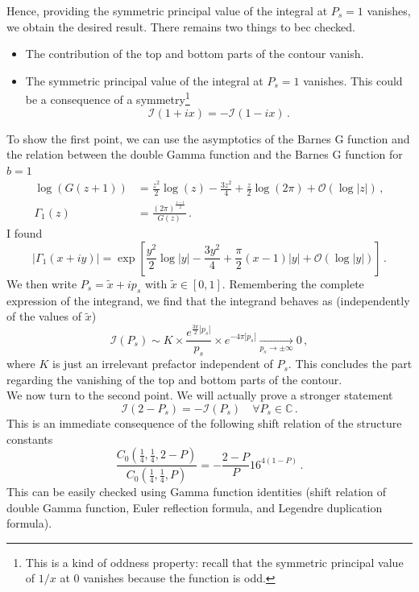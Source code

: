 \documentclass[11pt]{article}
\begin{document}
Hence, providing the symmetric principal value of the integral at $P_s=1$ vanishes, we obtain the desired result. There remains two things to bec checked.
\begin{itemize}
    \item The contribution of the top and bottom parts of the contour vanish.
    \item The symmetric principal value of the integral at $P_s=1$ vanishes. This could be a consequence of a symmetry\footnote{This is a kind of oddness property: recall that the symmetric principal value of $1/x$ at $0$ vanishes because the function is odd.}
    \begin{equation}
    \mathcal{I}(1+i x) = -\mathcal{I}(1-ix)\,.
    \end{equation}
\end{itemize}
To show the first point, we can use the asymptotics of the Barnes G function and the relation between the double Gamma function and the Barnes G function for $b=1$
\begin{equation}
\begin{aligned}
     \log(G(z+1))&=\frac{z^2}{2}\log(z)-\frac{3z^2}{4}+\frac{z}{2}\log(2\pi)+\mathcal{O}(\log|z|)\,,\\
     \Gamma_1(z) &= \frac{(2\pi)^{\frac{z-1}{2}}}{G(z)}\,.
\end{aligned}
\end{equation}
I found 
\begin{equation}
    |\Gamma_1(x+iy)|=\exp\left[\frac{y^2}{2}\log|y| -\frac{3y^2}{4}+\frac{\pi}{2}(x-1)|y|+\mathcal{O}(\log|y|)\right]\,.
\end{equation}
We then write $P_s = \tilde{x}+ip_s$ with $\tilde{x}\in[0,1]$. Remembering the complete expression of the integrand, we find that the integrand behaves as (independently of the values of $\tilde{x}$)
\begin{equation}
    \mathcal{I}(P_s) \sim K \times \frac{e^{\frac{3\pi}{2}|p_s|}}{p_s}\times e^{-4\pi|p_s|} \underset{p_s\to \pm \infty}{\to} 0\,,
\end{equation}
where $K$ is just an irrelevant prefactor independent of $P_s$. This concludes the part regarding the vanishing of the top and bottom parts of the contour.\\

We now turn to the second point. We will actually prove a stronger statement
\begin{equation}
    \mathcal{I}(2-P_s) = -\mathcal{I}(P_s) \quad  \forall P_s \in \mathbb{C}\,.
\end{equation}
This is an immediate consequence of the following shift relation of the structure constants
\begin{equation}
    \frac{C_0\left(\frac{1}{4},\frac{1}{4}, 2-P\right)}{C_0\left(\frac{1}{4},\frac{1}{4}, P\right)} = -\frac{2-P}{P}16^{4(1-P)}\,.
\end{equation}
This can be easily checked using Gamma function identities (shift relation of double Gamma function, Euler reflection formula, and Legendre duplication formula).
\end{document}
